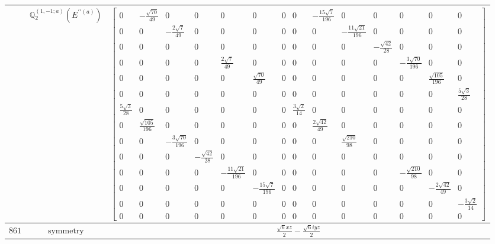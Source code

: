 \documentclass[fleqn,8pt,landscape]{jsarticle}
\begin{document}
\begin{longtable}{ccc}
$  $ & $ \mathbb{Q}_{2}^{(1,-1;a)}(E^{\prime\prime(a)}) $ & $ \begin{bmatrix} 0 & - \frac{\sqrt{70}}{49} & 0 & 0 & 0 & 0 & 0 & 0 & - \frac{15 \sqrt{7}}{196} & 0 & 0 & 0 & 0 & 0 \\ 0 & 0 & - \frac{2 \sqrt{7}}{49} & 0 & 0 & 0 & 0 & 0 & 0 & - \frac{11 \sqrt{21}}{196} & 0 & 0 & 0 & 0 \\ 0 & 0 & 0 & 0 & 0 & 0 & 0 & 0 & 0 & 0 & - \frac{\sqrt{42}}{28} & 0 & 0 & 0 \\ 0 & 0 & 0 & 0 & \frac{2 \sqrt{7}}{49} & 0 & 0 & 0 & 0 & 0 & 0 & - \frac{3 \sqrt{70}}{196} & 0 & 0 \\ 0 & 0 & 0 & 0 & 0 & \frac{\sqrt{70}}{49} & 0 & 0 & 0 & 0 & 0 & 0 & \frac{\sqrt{105}}{196} & 0 \\ 0 & 0 & 0 & 0 & 0 & 0 & 0 & 0 & 0 & 0 & 0 & 0 & 0 & \frac{5 \sqrt{3}}{28} \\ \frac{5 \sqrt{3}}{28} & 0 & 0 & 0 & 0 & 0 & 0 & \frac{3 \sqrt{2}}{14} & 0 & 0 & 0 & 0 & 0 & 0 \\ 0 & \frac{\sqrt{105}}{196} & 0 & 0 & 0 & 0 & 0 & 0 & \frac{2 \sqrt{42}}{49} & 0 & 0 & 0 & 0 & 0 \\ 0 & 0 & - \frac{3 \sqrt{70}}{196} & 0 & 0 & 0 & 0 & 0 & 0 & \frac{\sqrt{210}}{98} & 0 & 0 & 0 & 0 \\ 0 & 0 & 0 & - \frac{\sqrt{42}}{28} & 0 & 0 & 0 & 0 & 0 & 0 & 0 & 0 & 0 & 0 \\ 0 & 0 & 0 & 0 & - \frac{11 \sqrt{21}}{196} & 0 & 0 & 0 & 0 & 0 & 0 & - \frac{\sqrt{210}}{98} & 0 & 0 \\ 0 & 0 & 0 & 0 & 0 & - \frac{15 \sqrt{7}}{196} & 0 & 0 & 0 & 0 & 0 & 0 & - \frac{2 \sqrt{42}}{49} & 0 \\ 0 & 0 & 0 & 0 & 0 & 0 & 0 & 0 & 0 & 0 & 0 & 0 & 0 & - \frac{3 \sqrt{2}}{14} \\ 0 & 0 & 0 & 0 & 0 & 0 & 0 & 0 & 0 & 0 & 0 & 0 & 0 & 0 \end{bmatrix} $ \\ \hline
$ 861 $ & $ \text{symmetry} $ & $ \frac{\sqrt{6} x z}{2} - \frac{\sqrt{6} i y z}{2} $ \\

\end{longtable}
\end{document}
